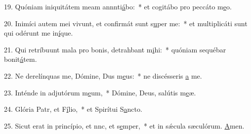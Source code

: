 19. Quóniam iniquitátem meam annnti\uline{á}bo:~* et cogitábo pro peccáto m\uline{e}o.\par 
20. Inimíci autem mei vivunt, et confirmát sunt s\uline{u}per me:~* et multiplicáti sunt qui odérunt me in\uline{í}que.\par 
21. Qui retríbuunt mala pro bonis, detrahbant m\uline{i}hi:~* quóniam sequébar bonit\uline{á}tem.\par 
22. Ne derelínquas me, Dómine, Dus m\uline{e}us:~* ne discésseris \uline{a} me.\par 
23. Inténde in adjutórum m\uline{e}um,~* Dómine, Deus, salútis m\uline{e}æ.\par 
24. Glória Patr, et F\uline{í}lio,~* et Spirítui S\uline{a}ncto.\par 
25. Sicut erat in princípio, et nnc, et s\uline{e}mper,~* et in sǽcula sæculórum. \uline{A}men.\par 
